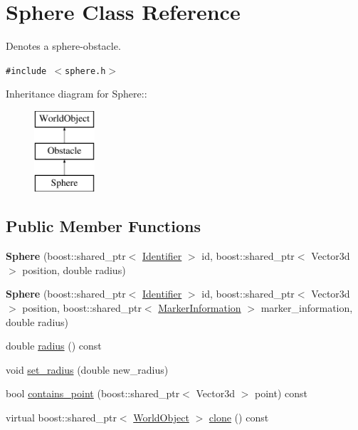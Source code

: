 \hypertarget{class_sphere}{
\section{Sphere Class Reference}
\label{class_sphere}
}
Denotes a sphere-obstacle.  


{\tt \#include $<$sphere.h$>$}

Inheritance diagram for Sphere::\begin{figure}[H]
\begin{center}
\leavevmode
\includegraphics[height=3cm]{class_sphere}
\end{center}
\end{figure}
\subsection*{Public Member Functions}
\begin{CompactItemize}
\item 
\hypertarget{class_sphere_e52b4416e92f208ab754e0d8692091ed}{
\textbf{Sphere} (boost::shared\_\-ptr$<$ \hyperlink{class_identifier}{Identifier} $>$ id, boost::shared\_\-ptr$<$ Vector3d $>$ position, double radius)}
\label{class_sphere_e52b4416e92f208ab754e0d8692091ed}

\item 
\hypertarget{class_sphere_d897b22b306c1b275dafddf22c3d75c8}{
\textbf{Sphere} (boost::shared\_\-ptr$<$ \hyperlink{class_identifier}{Identifier} $>$ id, boost::shared\_\-ptr$<$ Vector3d $>$ position, boost::shared\_\-ptr$<$ \hyperlink{class_marker_information}{MarkerInformation} $>$ marker\_\-information, double radius)}
\label{class_sphere_d897b22b306c1b275dafddf22c3d75c8}

\item 
double \hyperlink{class_sphere_82c3e6746f79196c744b46f39569689e}{radius} () const 
\item 
void \hyperlink{class_sphere_67b1c1595ffd2c0dcf8abfeca8de5c36}{set\_\-radius} (double new\_\-radius)
\item 
bool \hyperlink{class_sphere_f031ce505d4f21bc7d8bf1b7684280e0}{contains\_\-point} (boost::shared\_\-ptr$<$ Vector3d $>$ point) const 
\item 
virtual boost::shared\_\-ptr$<$ \hyperlink{class_world_object}{WorldObject} $>$ \hyperlink{class_sphere_6fcc846dbbef396057b572b9a0786cdc}{clone} () const 
\end{CompactItemize}
